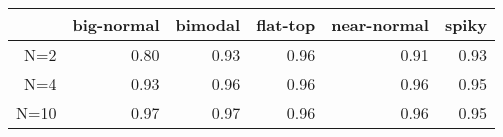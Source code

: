 \begin{tabular}{rrrrrr}
  \toprule  & big-normal & bimodal & flat-top & near-normal & spiky \\ 
  \midrule N=2 & 0.80 & 0.93 & 0.96 & 0.91 & 0.93 \\ 
  N=4 & 0.93 & 0.96 & 0.96 & 0.96 & 0.95 \\ 
  N=10 & 0.97 & 0.97 & 0.96 & 0.96 & 0.95 \\ 
   \bottomrule \end{tabular}

